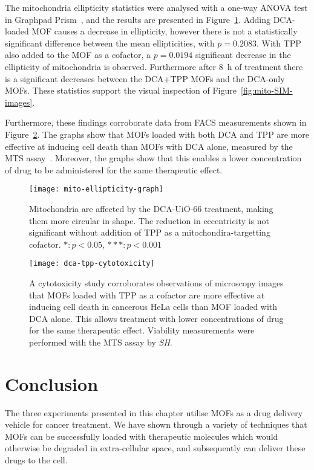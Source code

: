 The mitochondria ellipticity statistics were analysed with a one-way ANOVA test in Graphpad Prism~\cite{graphpadprism}, and the results are presented in Figure~\ref{fig:mito-ellipticity-graph}.
Adding DCA-loaded MOF causes a decrease in ellipticity, however there is not a statistically significant difference between the mean ellipticities, with $p=0.2083$.
With TPP also added to the MOF as a cofactor, a $p=0.0194$ significant decrease in the ellipticity of mitochondria is observed.
Furthermore after \SI{8}{\hour} of treatment there is a significant decreases between the DCA+TPP MOFs and the DCA-only MOFs.
These statistics support the visual inspection of Figure~\ref{fig:mito-SIM-images}.

Furthermore, these findings corroborate data from FACS measurements shown in Figure~\ref{fig:dca-tpp-cytotoxicity}.
The graphs show that MOFs loaded with both DCA and TPP are more effective at inducing cell death than MOFs with DCA alone, measured by the MTS assay~\cite{mosmann1983rapid, mtsassay}.
Moreover, the graphs show that this enables a lower concentration of drug to be administered for the same therapeutic effect.

\begin{figure}[htbp!]
\centering
\texttt{[image: mito-ellipticity-graph]}
\caption[MOFs: Mitochondria become more circular when treated with DCA and TPP delivered by UiO-66 MOF] {Mitochondria are affected by the DCA-UiO-66 treatment, making them more circular in shape. The reduction in eccentricity is not significant without addition of TPP as a mitochondira-targetting cofactor. $*: p<0.05$, $***: p<0.001$}
\label{fig:mito-ellipticity-graph}
\end{figure}

\begin{figure}[htbp!]
\centering
\texttt{[image: dca-tpp-cytotoxicity]}
\caption[MOFs: Loading MOFs with TPP as a cofactor facilitates lower drug concentration] {A cytotoxicity study corroborates observations of microscopy images that MOFs loaded with TPP as a cofactor are more effective at inducing cell death in cancerous HeLa cells than MOF loaded with DCA alone. This allows treatment with lower concentrations of drug for the same therapeutic effect. Viability measurements were performed with the MTS assay by \textit{SH}. }
\label{fig:dca-tpp-cytotoxicity}
\end{figure}


\section{Conclusion} \label{sec:mof-conclusion}
The three experiments presented in this chapter utilise MOFs as a drug delivery vehicle for cancer treatment.
We have shown through a variety of techniques that MOFs can be successfully loaded with therapeutic molecules which would otherwise be degraded in extra-cellular space, and subsequently can deliver these drugs to the cell.

